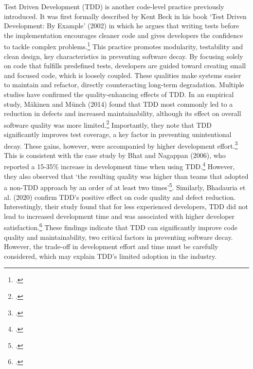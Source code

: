 Test Driven Development (TDD) is another code-level practice previously introduced. It was first formally described by Kent Beck in his book
`Test Driven Development: By Example' (2002) in which he argues that writing tests before the implementation
encourages cleaner code and gives developers the confidence to tackle complex problems.\footcite[pp. 8-9]{beckTestdrivenDevelopmentExample2002}
This practice promotes modularity, testability and clean design, key characteristics in preventing software decay. By focusing solely on code
that fulfills predefined tests, developers are guided toward creating small and focused code, which is loosely coupled. These qualities make systems
easier to maintain and refactor, directly counteracting long-term degradation.
Multiple studies have confirmed the quality-enhancing effects of \ac{TDD}.
In an empirical study, Mäkinen and Münch (2014) found that  TDD most commonly led to a reduction in defects and increased maintainability, 
although its effect on overall software quality was more limited.\footcite[13]{inproceedings}
Importantly, they note that TDD significantly improves test coverage, a key factor in preventing unintentional decay.
These gains, however, were accompanied by higher development effort.\footcite[13]{inproceedings}
This is consistent with the case study by Bhat and Nagappan (2006), who reported a 15-35\% increase in development time when using \ac{TDD}.\footcite[361]{bhatEvaluatingEfficacyTestdriven2006a}
However, they also observed that `the resulting quality was higher than teams that adopted a non-TDD approach by an order of at least two times'\footcite[361]{bhatEvaluatingEfficacyTestdriven2006a}.
Similarly, Bhadauria et al. (2020) confirm TDD’s positive effect on code quality and defect reduction.
Interestingly, their study found that for less experienced developers, TDD did not lead to increased development time and was associated with higher developer satisfaction.\footcite[1058]{bhadauriaPerformanceOutcomesTestDriven2020}
These findings indicate that TDD can significantly improve code quality and maintainability, two critical factors in preventing software decay.
However, the trade-off in development effort and time must be carefully considered, which may explain TDD's limited adoption in the industry.

